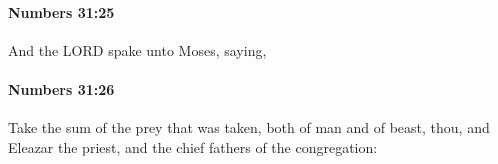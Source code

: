 		\paragraph{Numbers 31:25} %
			\label{NUMBERS-31-25}

			And the LORD spake unto Moses, saying,


		\paragraph{Numbers 31:26} %
			\label{NUMBERS-31-26}

			Take the sum of the prey that was taken, both of man and of beast, thou, and Eleazar the priest, and the chief fathers of the congregation:


